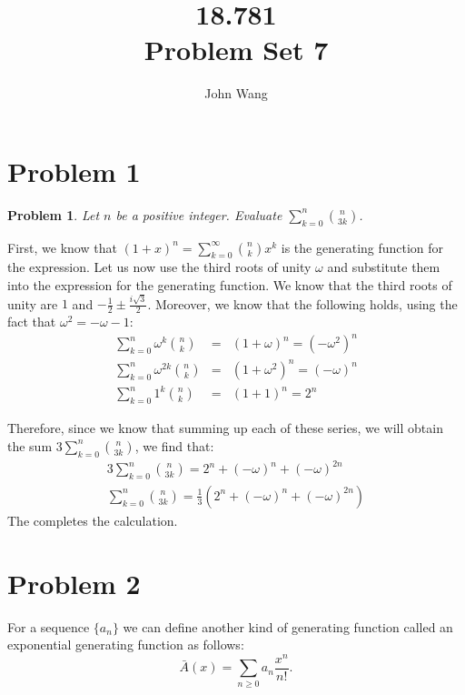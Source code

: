 \documentclass[psamsfonts]{amsart}
\title{18.781 \\
Problem Set 7}
\author{John Wang}
\newtheorem{prob}{Problem}[section]
\newenvironment{sol}{{\bfseries Solution}}{\qedsymbol}
\theoremstyle{definition}
\theoremstyle{remark}
\numberwithin{equation}{section}
\begin{document}
\maketitle

\section{Problem 1}

\begin{prob}
Let $n$ be a positive integer. Evaluate $\sum_{k=0}^n {n \choose 3k}$. 
\end{prob}

\begin{sol}
First, we know that $(1 + x)^n = \sum_{k=0}^{\infty} {n \choose k} x^k$ is the generating function for the expression. Let us now use the third roots of unity $\omega$ and substitute them into the expression for the generating function. We know that the third roots of unity are $1$ and $-\frac{1}{2} \pm\frac{ i\sqrt{3}}{2}$. Moreover, we know that the following holds, using the fact that $\omega^2 = -\omega - 1$:
\begin{eqnarray}
\sum_{k=0}^{n} \omega^k {n \choose k} &=& (1 + \omega)^n = (- \omega^2)^n \\
\sum_{k=0}^{n} \omega^{2k} {n \choose k} &=& (1 + \omega^2)^n = (- \omega)^n \\
\sum_{k=0}^{n} 1^k {n \choose k} &=& (1 + 1)^n = 2^n
\end{eqnarray}

Therefore, since we know that summing up each of these series, we will obtain the sum $3 \sum_{k=0}^n {n \choose 3k}$, we find that:
\begin{eqnarray}
3 \sum_{k=0}^n {n \choose 3k} = 2^n + (-\omega)^n + (- \omega)^{2n} \\
\sum_{k=0}^n {n \choose 3k} =  \frac{1}{3} \left( 2^n + (-\omega)^n + (- \omega)^{2n} \right)
\end{eqnarray}
The completes the calculation. 
\end{sol}

\section{Problem 2}

For a sequence $\{ a_n \}$ we can define another kind of generating function called an exponential generating function as follows: 
\begin{equation}
\bar{A}(x) = \sum_{n \geq 0} a_n \frac{x^n}{n!}.
\end{equation}
\end{document}
